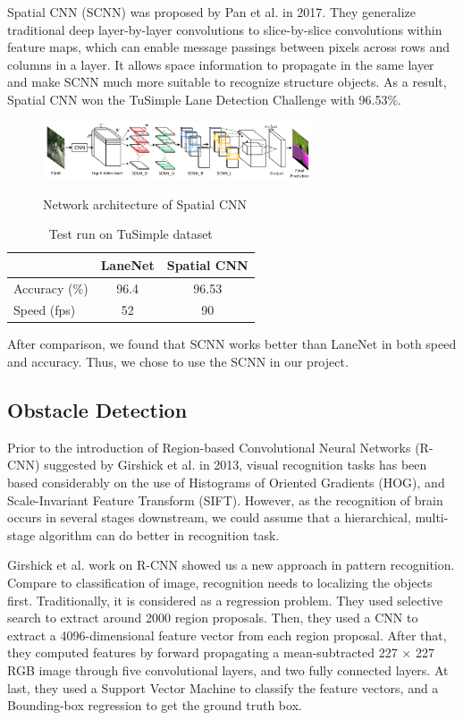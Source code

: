 \documentclass[runningheads]{llncs}
\begin{document}
Spatial CNN (SCNN) was proposed by Pan et al.
\cite{SpatialCNN} in 2017. They generalize traditional 
deep layer-by-layer convolutions to slice-by-slice 
convolutions within feature maps, which can enable message 
passings between pixels across rows and columns in a layer. 
It allows space information to propagate in the same layer 
and make SCNN much more suitable to recognize structure 
objects. As a result, Spatial CNN won the TuSimple Lane 
Detection Challenge with 96.53\%. 

\begin{figure}
    \centering
    \includegraphics[width=8cm]{reference/scnn}
    \label{fig:example}
    \caption{Network architecture of Spatial CNN}
\end{figure}

\begin{table}[!htbp]
	\centering
	\begin{tabular}{|l|c|c|}
		\hline 
		&LaneNet&Spatial CNN\\
		\hline  
		Accuracy (\%)&96.4&96.53\\
		\hline  
		Speed (fps)&52&90\\
		\hline 
	\end{tabular}
	\caption{Test run on TuSimple dataset}
\end{table}

After comparison, we found that SCNN works better than 
LaneNet in both speed and accuracy. Thus, we chose to use 
the SCNN in our project. 


\subsection{Obstacle Detection}
Prior to the introduction of Region-based Convolutional 
Neural Networks (R-CNN) suggested by Girshick et al. 
\cite{RCNN} in 2013, visual recognition tasks has been 
based considerably on the use of Histograms of Oriented 
Gradients (HOG)\cite{HOG}, and Scale-Invariant Feature 
Transform (SIFT)\cite{SIFT}. However, as the recognition of 
brain occurs in several stages downstream, we could assume 
that a hierarchical, multi-stage algorithm can do better in 
recognition task. 

Girshick et al. work on R-CNN showed us a new approach in 
pattern recognition. Compare to classification of image, 
recognition needs to localizing the objects first. 
Traditionally, it is considered as a regression problem. 
They used selective search to extract around 2000 region 
proposals. Then, they used a CNN to extract a 
4096-dimensional feature vector from each region proposal. 
After that, they computed features by forward propagating
a mean-subtracted 227 × 227 RGB image through five 
convolutional layers, and two fully connected layers. At 
last, they used a Support Vector Machine to classify the 
feature vectors, and a Bounding-box regression to get the 
ground truth box. 
\end{document}
